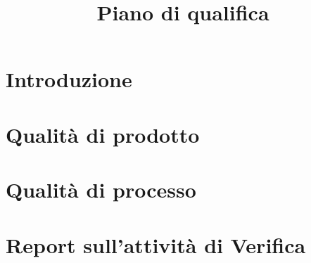 \documentclass{article}
\title{Piano di qualifica}
\begin{document}


\newpage
\section{Introduzione}%
\label{sec:introduzione}



\newpage
\section{Qualità di prodotto}%
\label{sec:qualita_di_prodotto}



\newpage
\section{Qualità di processo}%
\label{sec:qualita_di_processo}



\newpage
\section{Report sull'attività di Verifica}%
\label{sec:report_verifica}



\end{document}

